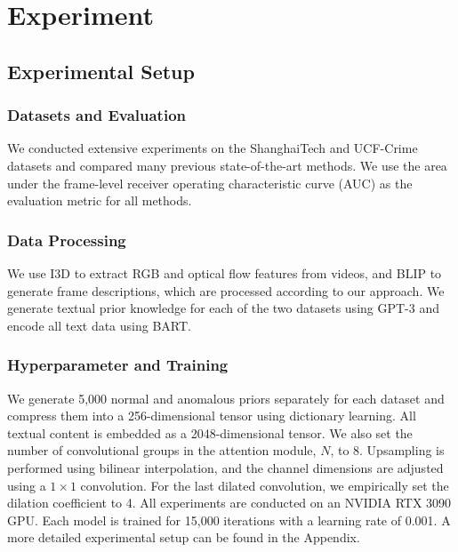 
\section{Experiment}
\label{sec:exp}

\subsection{Experimental Setup}

\subsubsection{Datasets and Evaluation}

We conducted extensive experiments on the ShanghaiTech\citep{a-luo2017revisit} and UCF-Crime\citep{a-sultani2018real} datasets and compared many previous state-of-the-art methods\citep{a-wu2022self,a-li2022self,a-tian2021weakly,a-sultani2018real,a-zhong2019graph, a-zaheer2020claws,a-feng2021mist,a-lv2023unbiased, a-chen2023mgfn,a-wan2020weakly, a-wu2021learning,a-pu2022locality}. We use the area under the frame-level receiver operating characteristic curve (AUC) as the evaluation metric for all methods.

\subsubsection{Data Processing}

We use I3D\citep{a-carreira2017quo} to extract RGB and optical flow features from videos, and BLIP\citep{a-li2022blip} to generate frame descriptions, which are processed according to our approach. We generate textual prior knowledge for each of the two datasets using GPT-3\citep{a-brown2020language} and encode all text data using BART\citep{a-lewis2019bart}.

\subsubsection{Hyperparameter and Training}

We generate 5,000 normal and anomalous priors separately for each dataset and compress them into a 256-dimensional tensor using dictionary learning. All textual content is embedded as a 2048-dimensional tensor. We also set the number of convolutional groups in the attention module, $N$, to 8. Upsampling is performed using bilinear interpolation, and the channel dimensions are adjusted using a $1 \times 1$ convolution. For the last dilated convolution, we empirically set the dilation coefficient to 4. All experiments are conducted on an NVIDIA RTX 3090 GPU. Each model is trained for 15,000 iterations with a learning rate of 0.001. A more detailed experimental setup can be found in the Appendix.

